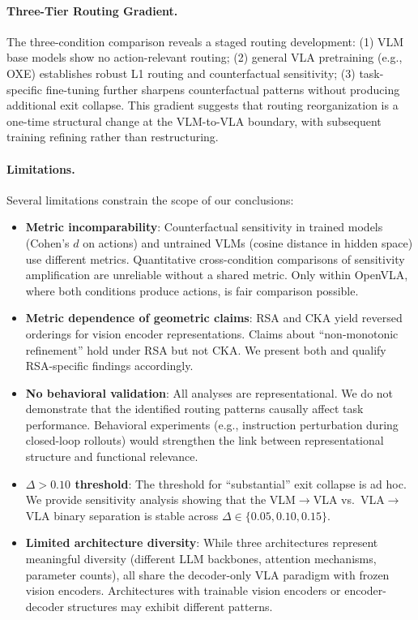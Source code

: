 \documentclass[10pt,letterpaper]{article}
\begin{document}
\paragraph{Three-Tier Routing Gradient.}
The three-condition comparison reveals a staged routing development: (1) VLM base models show no action-relevant routing; (2) general VLA pretraining (e.g., OXE) establishes robust L1 routing and counterfactual sensitivity; (3) task-specific fine-tuning further sharpens counterfactual patterns without producing additional exit collapse. This gradient suggests that routing reorganization is a one-time structural change at the VLM-to-VLA boundary, with subsequent training refining rather than restructuring.

\paragraph{Limitations.}
Several limitations constrain the scope of our conclusions:
\begin{itemize}
    \item \textbf{Metric incomparability}: Counterfactual sensitivity in trained models (Cohen's $d$ on actions) and untrained VLMs (cosine distance in hidden space) use different metrics. Quantitative cross-condition comparisons of sensitivity amplification are unreliable without a shared metric. Only within OpenVLA, where both conditions produce actions, is fair comparison possible.
    \item \textbf{Metric dependence of geometric claims}: RSA and CKA yield reversed orderings for vision encoder representations. Claims about ``non-monotonic refinement'' hold under RSA but not CKA. We present both and qualify RSA-specific findings accordingly.
    \item \textbf{No behavioral validation}: All analyses are representational. We do not demonstrate that the identified routing patterns causally affect task performance. Behavioral experiments (e.g., instruction perturbation during closed-loop rollouts) would strengthen the link between representational structure and functional relevance.
    \item \textbf{$\Delta > 0.10$ threshold}: The threshold for ``substantial'' exit collapse is ad hoc. We provide sensitivity analysis showing that the VLM$\to$VLA vs.\ VLA$\to$VLA binary separation is stable across $\Delta \in \{0.05, 0.10, 0.15\}$.
    \item \textbf{Limited architecture diversity}: While three architectures represent meaningful diversity (different LLM backbones, attention mechanisms, parameter counts), all share the decoder-only VLA paradigm with frozen vision encoders. Architectures with trainable vision encoders or encoder-decoder structures may exhibit different patterns.
\end{itemize}
\end{document}
